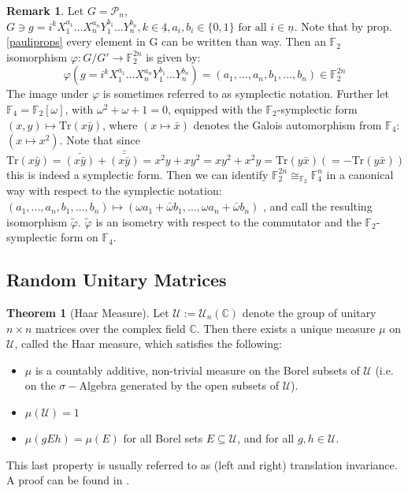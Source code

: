 \documentclass{article}
\def\P{\mathcal{P}}
\def\F{\mathbb{F}}
\def\C{\mathbb{C}}
\def\U{\mathcal{U}}
\def\n{\underline{n}}
\def\fa{\text{ for all }}
\def\Tr{\text{Tr}}
\theoremstyle{definition}
\newtheorem{theorem}[Satz]{Theorem}
\newtheorem{rem}[Satz]{Remark}
\begin{document}
\begin{rem}\label{symplecticnotation}
Let $G = \P_n$, $G \ni g = i^k X_1^{a_1}\ldots X_n^{a_n} Y_1^{b_1} \ldots Y_n^{b_n}, k \in \underline{4}, a_i, b_i \in \{0,1\} \fa i \in \n$. Note that by prop. \ref{pauliprops} every element in G can be written than way. Then an $\F_2$ isomorphism $\varphi : G/G' \rightarrow \F_2^{2n}$ is given by:
\[ \varphi (g = i^k X_1^{a_1}\ldots X_n^{a_n} Y_1^{b_1} \ldots Y_n^{b_n}) = (a_1, \ldots, a_n, b_1, \ldots, b_n) \in \F_2^{2n} \]
The image under $\varphi$ is sometimes referred to as symplectic notation.
Further let $\F_4 = \F_2[\omega]$, with $\omega^2 + \omega + 1 = 0$, equipped with the $\F_2$-symplectic form $ (x,y) \mapsto \Tr(x \bar y)$, where $ (x \mapsto \bar x)$ denotes the Galois automorphism from $\F_4$: $(x \mapsto x^2)$.
Note that since $\Tr(x \bar y) = \bar{(x \bar y)} + \bar{\bar{(x \bar y)}} = x^2y + xy^2 = xy^2 + x^2y = \Tr(y \bar x) (= - \Tr(y \bar x))$ this is indeed a symplectic form.
Then we can identify $\F_2^{2n} \cong_{\F_2} \F_4^n$ in a canonical way with respect to the symplectic notation: $(a_1, \ldots, a_n, b_1, \ldots, b_n) \mapsto (\omega a_1 + \bar \omega b_1, \ldots, \omega a_n + \bar \omega b_n)$
, and call the resulting isomorphism $\tilde \varphi$. $\tilde \varphi$ is an isometry with respect to the commutator and the $\F_2$-symplectic form on $\F_4$. 
\end{rem}



\subsection{Random Unitary Matrices}

\begin{theorem}[Haar Measure]
Let $\U := \U_n(\C)$ denote the group of unitary $n \times n$ matrices over the complex field $\C$. 
Then there exists a unique measure $\mu$ on $\U$, called the Haar measure, which satisfies the following:
\begin{itemize}
\item $\mu$ is a countably additive, non-trivial measure on the Borel subsets of $\U$ (i.e. on the $\sigma-$Algebra generated by the open subsets of $\U$). 
\item $\mu(\U) = 1$
\item $\mu(gEh) = \mu(E)$ for all Borel sets $E \subseteq \U$, and for all $g,h \in \U$. 
\end{itemize}
 
This last property is usually referred to as (left and right) translation invariance.
A proof can be found in \cite{halmos}.
\end{theorem}
\end{document}
